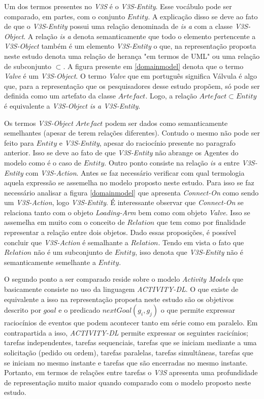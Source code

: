 Um dos termos presentes no \textit{V3S} é o \textit{V3S-Entity}. Esse vocábulo pode ser comparado, em partes, com o conjunto $ Entity $. A explicação disso se deve ao fato de que o \textit{V3S-Entity} possui uma relação denominada de \textit{is a} com a classe \textit{V3S-Object}. A relação \textit{is a} denota semanticamente que todo o elemento pertencente a \textit{V3S-Object} também é um elemento \textit{V3S-Entity} o que, na representação proposta neste estudo denota uma relação de herança "em termos de UML" ou uma relação de subconjunto $ \subset $. A figura presente em \ref{domainmodel} denota que o termo \textit{Valve} é um \textit{V3S-Object}. O termo \textit{Valve} que em português significa Válvula é algo que, para a representação que os pesquisadores desse estudo propõem, só pode ser definida como um artefato da classe $Artefact$. Logo, a relação $Artefact \subset Entity $ é equivalente a \textit{V3S-Object is a V3S-Entity}.

Os termos \textit{V3S-Object} $Artefact$ podem ser dados como semanticamente semelhantes (apesar de terem relações diferentes). Contudo o mesmo não pode ser feito para $Entity$ e \textit{V3S-Entity}, apesar do raciocínio presente no paragrafo anterior. Isso se deve ao fato de que \textit{V3S-Entity} não abrange os Agentes do modelo como é o caso de $Entity$. Outro ponto consiste na relação \textit{is a} entre \textit{V3S-Entity} com \textit{V3S-Action}. Antes se faz necessário verificar com qual termologia aquela expressão se assemelha no modelo proposto neste estudo. Para isso se faz necessário analisar a figura \ref{domainmodel} que apresenta \textit{Connect-On} como sendo um \textit{V3S-Action}, logo \textit{V3S-Entity}. É interessante observar que \textit{Connect-On} se relaciona tanto com o objeto \textit{Loading-Arm} bem como com objeto \textit{Valve}. Isso se assemelha em muito com o conceito de $Relation$ que tem como por finalidade representar a relação entre dois objetos. Dado essas proposições, é possível concluir que \textit{V3S-Action} é semalhante a $Relation$. Tendo em vista o fato que $Relation$ não é um subconjunto 
de $Entity$, isso denota que \textit{V3S-Entity} não é semanticamente semelhante a $Entity$. 

O segundo ponto a ser comparado reside sobre o modelo \textit{Activity Models} que basicamente consiste no uso da linguagem \textit{ACTIVITY-DL}. O que existe de equivalente a isso na representação proposta neste estudo são os objetivos descrito por $goal$ e o predicado $nextGoal(g_i,g_j)$ o que permite expressar raciocínios de eventos que podem acontecer tanto em série como em paralelo. Em contrapartida a isso, \textit{ACTIVITY-DL} permite expressar os seguintes racicínios; tarefas independentes, tarefas sequenciais, tarefas que se iniciam mediante a uma solicitação (pedido ou ordem), tarefas paralelas, tarefas  simultâneas, tarefas que se iniciam no mesmo instante e tarefas que são encerradas no mesmo instante. Portanto, em termos de relações entre tarefas o \textit{V3S} apresenta uma profundidade de representação muito maior quando comparado com o modelo proposto neste estudo. 

